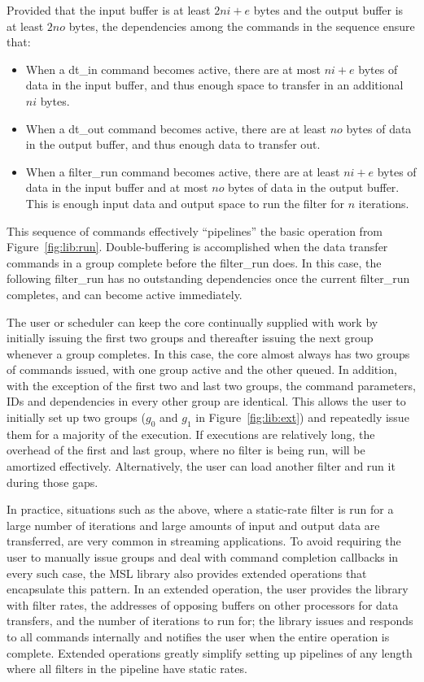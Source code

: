 Provided that the input buffer is at least $2ni+e$ bytes and the output buffer is at least $2no$ bytes, the dependencies among the commands in the sequence ensure that:
\begin{itemize}
\item When a \textsf{dt\_in} command becomes active, there are at most $ni+e$ bytes of data in the input buffer, and thus enough space to transfer in an additional $ni$ bytes.
\item When a \textsf{dt\_out} command becomes active, there are at least $no$ bytes of data in the output buffer, and thus enough data to transfer out.
\item When a \textsf{filter\_run} command becomes active, there are at least $ni+e$ bytes of data in the input buffer and at most $no$ bytes of data in the output buffer. This is enough input data and output space to run the filter for $n$ iterations.
\end{itemize}

This sequence of commands effectively ``pipelines'' the basic operation from Figure~\ref{fig:lib:run}. Double-buffering is accomplished when the data transfer commands in a group complete before the \textsf{filter\_run} does. In this case, the following \textsf{filter\_run} has no outstanding dependencies once the current \textsf{filter\_run} completes, and can become active immediately.

The user or scheduler can keep the core continually supplied with work
by initially issuing the first two groups and thereafter issuing the next
group whenever a group completes. In this case, the core almost always
has two groups of commands issued, with one group active and the other
queued. In addition, with the exception of the first two and last two
groups, the command parameters, IDs and dependencies in every other
group are identical. This allows the user to initially set up two
groups ($g_0$ and $g_1$ in Figure~\ref{fig:lib:ext}) and repeatedly
issue them for a majority of the execution. If executions are
relatively long, the overhead of the first and last group, where no
filter is being run, will be amortized effectively. Alternatively, the
user can load another filter and run it during those gaps.

In practice, situations such as the above, where a static-rate filter
is run for a large number of iterations and large amounts of input and
output data are transferred, are very common in streaming applications. To
avoid requiring the user to manually issue groups and deal with
command completion callbacks in every such case, the MSL library also
provides extended operations that encapsulate this pattern. In an
extended operation, the user provides the library with filter rates,
the addresses of opposing buffers on other processors for data
transfers, and the number of iterations to run for; the library issues and
responds to all commands internally and notifies the user when the
entire operation is complete.
Extended operations greatly simplify setting up pipelines
of any length where all filters in the pipeline have static rates.

